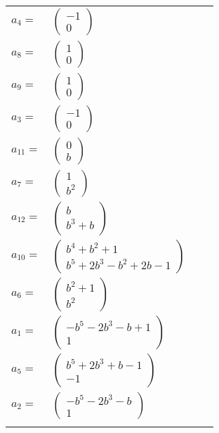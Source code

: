 \documentclass[1p]{elsarticle_modified}
\theoremstyle{definition}
\begin{document}
\begin{tabular}{m{7pt} m{180pt} m{7pt} m{180pt} }
\flushright $a_{4}=$&$\begin{pmatrix}-1\\0\end{pmatrix}$ \\
\flushright $a_{8}=$&$\begin{pmatrix}1\\0\end{pmatrix}$ \\
\flushright $a_{9}=$&$\begin{pmatrix}1\\0\end{pmatrix}$ \\
\flushright $a_{3}=$&$\begin{pmatrix}-1\\0\end{pmatrix}$ \\
\flushright $a_{11}=$&$\begin{pmatrix}0\\b\end{pmatrix}$ \\
\flushright $a_{7}=$&$\begin{pmatrix}1\\b^2\end{pmatrix}$ \\
\flushright $a_{12}=$&$\begin{pmatrix}b\\b^3+b\end{pmatrix}$ \\
\flushright $a_{10}=$&$\begin{pmatrix}b^4+b^2+1\\b^5+2 b^3- b^2+2 b-1\end{pmatrix}$ \\
\flushright $a_{6}=$&$\begin{pmatrix}b^2+1\\b^2\end{pmatrix}$ \\
\flushright $a_{1}=$&$\begin{pmatrix}- b^5-2 b^3- b+1\\1\end{pmatrix}$ \\
\flushright $a_{5}=$&$\begin{pmatrix}b^5+2 b^3+b-1\\-1\end{pmatrix}$ \\
\flushright $a_{2}=$&$\begin{pmatrix}- b^5-2 b^3- b\\1\end{pmatrix}$\\&\end{tabular}
\end{document}
